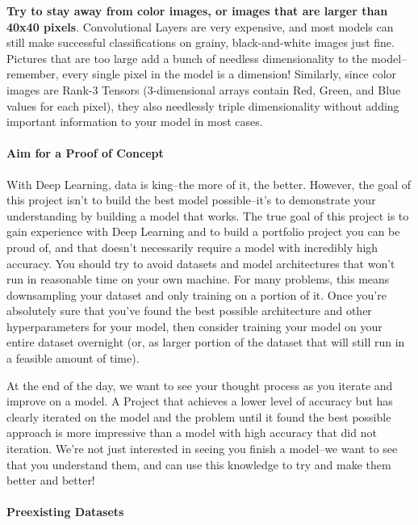 \documentclass[11pt]{article}
\begin{document}
\textbf{Try to stay away from color images, or images that are larger
than 40x40 pixels}. Convolutional Layers are very expensive, and most
models can still make successful classifications on grainy,
black-and-white images just fine. Pictures that are too large add a
bunch of needless dimensionality to the model--remember, every single
pixel in the model is a dimension! Similarly, since color images are
Rank-3 Tensors (3-dimensional arrays contain Red, Green, and Blue values
for each pixel), they also needlessly triple dimensionality without
adding important information to your model in most cases.

\hypertarget{aim-for-a-proof-of-concept}{%
\paragraph{Aim for a Proof of
Concept}\label{aim-for-a-proof-of-concept}}

With Deep Learning, data is king--the more of it, the better. However,
the goal of this project isn't to build the best model possible--it's to
demonstrate your understanding by building a model that works. The true
goal of this project is to gain experience with Deep Learning and to
build a portfolio project you can be proud of, and that doesn't
necessarily require a model with incredibly high accuracy. You should
try to avoid datasets and model architectures that won't run in
reasonable time on your own machine. For many problems, this means
downsampling your dataset and only training on a portion of it. Once
you're absolutely sure that you've found the best possible architecture
and other hyperparameters for your model, then consider training your
model on your entire dataset overnight (or, as larger portion of the
dataset that will still run in a feasible amount of time).

At the end of the day, we want to see your thought process as you
iterate and improve on a model. A Project that achieves a lower level of
accuracy but has clearly iterated on the model and the problem until it
found the best possible approach is more impressive than a model with
high accuracy that did not iteration. We're not just interested in
seeing you finish a model--we want to see that you understand them, and
can use this knowledge to try and make them better and better!

\hypertarget{preexisting-datasets}{%
\paragraph{Preexisting Datasets}\label{preexisting-datasets}}
\end{document}
